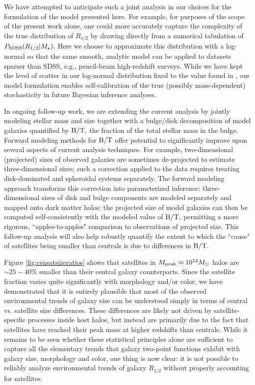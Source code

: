 \documentclass[usenatbib,usegraphicx,letterpaper]{mn2e}
\newcommand{\rhalf}{R_{1/2}}
\newcommand{\mstar}{M_{\star}}
\newcommand{\mpeak}{M_{\rm peak}}
\newcommand{\msun}{M_\odot}
\begin{document}
We have attempted to anticipate such a joint analysis in our choices for the formulation of the model presented here. For example, for purposes of the scope of the present work alone, one could more accurately capture the complexity of the true distribution of $\rhalf$ by drawing directly from a numerical tabulation of $P_{\rm SDSS}(\rhalf\vert\mstar).$ Here we choose to approximate this distribution with a log-normal so that the same smooth, analytic model can be applied to datasets sparser than SDSS, e.g., pencil-beam high-redshift surveys. While we have kept the level of scatter in our log-normal distribution fixed to the value found in \cite{somerville_etal17}, our model formulation enables self-calibration of the true (possibly mass-dependent) stochasticity in future Bayesian inference analyses.

In ongoing follow-up work, we are extending the current analysis by jointly modeling stellar mass and size together with a bulge/disk decomposition of model galaxies quantified by ${\rm B/T},$ the fraction of the total stellar mass in the bulge. Forward modeling methods for ${\rm B/T}$ offer potential to significantly improve upon several aspects of current analysis techniques. For example, two-dimensional (projected) sizes of observed galaxies are sometimes de-projected to estimate three-dimensional sizes; such a correction applied to the data requires treating disk-dominated and spheroidal systems separately. The forward modeling approach transforms this correction into parameterized inference: three-dimensional sizes of disk and bulge components are modeled separately and mapped onto dark matter halos; the projected size of model galaxies can then be computed self-consistently with the modeled value of ${\rm B/T},$ permitting a more rigorous, ``apples-to-apples" comparison to observations of projected size. This follow-up analysis will also help robustly quantify the extent to which the ``cause" of satellites being smaller than centrals is due to differences in ${\rm B/T}.$

Figure \ref{fig:censatsizeratios} shows that satellites in $\mpeak\approx10^{12}\msun$ halos are $\sim25-40\%$ smaller than their central galaxy counterparts. Since the satellite fraction varies quite significantly with morphology and/or color, we have demonstrated that it is entirely plausible that most of the observed environmental trends of galaxy size can be understood simply in terms of central vs. satellite size differences. These differences are likely not driven by satellite-specific processes inside host halos, but instead are primarily due to the fact that satellites have reached their peak mass at higher redshifts than centrals. While it remains to be seen whether these statistical principles alone are sufficient to capture all the elementary trends that galaxy two-point functions exhibit with galaxy size, morphology and color, one thing is now clear: it is not possible to reliably analyze environmental trends of galaxy $\rhalf$ without properly accounting for satellites.
\end{document}
